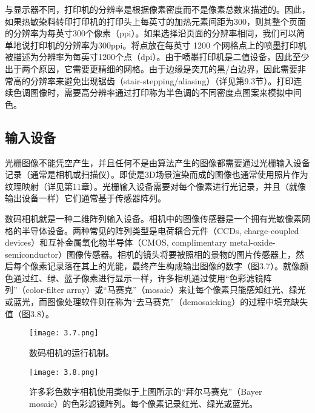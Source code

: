 \documentclass[lang=cn,12pt]{elegantbook}
\begin{document}
与显示器不同，打印机的分辨率是根据像素密度而不是像素总数来描述的。因此，如果热敏染料转印打印机的打印头上每英寸的加热元素间距为300，则其整个页面的分辨率为每英寸300个像素（ppi）。如果选择沿页面的分辨率相同，我们可以简单地说打印机的分辨率为300ppi。将点放在每英寸 1200 个网格点上的喷墨打印机被描述为分辨率为每英寸1200个点（dpi）。由于喷墨打印机是二值设备，因此至少出于两个原因，它需要更精细的网格。由于边缘是突兀的黑/白边界，因此需要非常高的分辨率来避免出现锯齿（stair-stepping/aliasing）（详见第9.3节）。打印连续色调图像时，需要高分辨率通过打印称为半色调的不同密度点图案来模拟中间色。


\subsection{输入设备}

光栅图像不能凭空产生，并且任何不是由算法产生的图像都需要通过光栅输入设备记录（通常是相机或扫描仪）。即使是3D场景渲染而成的图像也通常使用照片作为纹理映射（详见第11章）。光栅输入设备需要对每个像素进行光记录，并且（就像输出设备一样）它们通常基于传感器阵列。

数码相机就是一种二维阵列输入设备。相机中的图像传感器是一个拥有光敏像素网格的半导体设备。两种常见的阵列类型是电荷耦合元件（CCDs, charge-coupled devices）和互补金属氧化物半导体（CMOS, complimentary metal-oxide-semiconductor）图像传感器。相机的镜头将要被照相的景物的图片传感器上，然后每个像素记录落在其上的光能，最终产生构成输出图像的数字（图3.7）。就像颜色通过红、绿、蓝子像素进行显示一样，许多相机通过使用“色彩滤镜阵列”（color-filter array）或“马赛克”（mosaic）来让每个像素只能感知红光、绿光或蓝光，而图像处理软件则在称为“去马赛克”（demosaicking）的过程中填充缺失值（图3.8）。

\begin{figure}[htb]
  \centering
  \begin{minipage}[t]{0.45\textwidth}
  \centering
  \texttt{[image: 3.7.png]}
  \caption{数码相机的运行机制。}
  \end{minipage}
  \begin{minipage}[t]{0.45\textwidth}
  \centering
  \texttt{[image: 3.8.png]}
  \caption{许多彩色数字相机使用类似于上图所示的“拜尔马赛克”（Bayer mosaic）的色彩滤镜阵列。每个像素记录红光、绿光或蓝光。}
  \end{minipage}
\end{figure}
\end{document}
